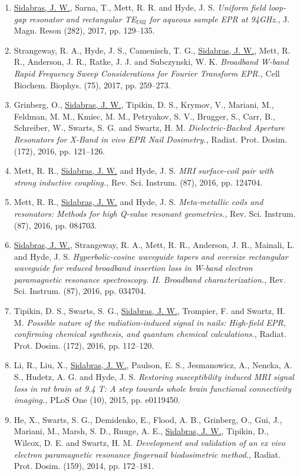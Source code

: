 \begin{enumerate}
    \item \underline{Sidabras, J. W.}, Sarna, T., Mett, R. R. and Hyde, J. S. \textit{Uniform field loop-gap resonator and rectangular TE$_{U02}$ for aqueous sample EPR at 94GHz.,} J. Magn. Reson (282), 2017, pp. 129--135.
    \item Strangeway, R. A., Hyde, J. S., Camenisch, T. G., \underline{Sidabras, J. W.}, Mett, R. R., Anderson, J. R., Ratke, J. J. and Subczynski, W. K. \textit{Broadband W-band Rapid Frequency Sweep Considerations for Fourier Transform EPR.,} Cell Biochem. Biophys. (75), 2017, pp. 259--273.
    \item Grinberg, O., \underline{Sidabras, J. W.}, Tipikin, D. S., Krymov, V., Mariani, M., Feldman, M. M., Kmiec, M. M., Petryakov, S. V., Brugger, S., Carr, B., Schreiber, W., Swarts, S. G. and Swartz, H. M. \textit{Dielectric-Backed Aperture Resonators for X-Band in vivo EPR Nail Dosimetry.,} Radiat. Prot. Dosim. (172), 2016, pp. 121--126.
    \item Mett, R. R., \underline{Sidabras, J. W.} and Hyde, J. S. \textit{MRI surface-coil pair with strong inductive coupling.,} Rev. Sci. Instrum. (87), 2016, pp. 124704.
    \item Mett, R. R., \underline{Sidabras, J. W.} and Hyde, J. S. \textit{Meta-metallic coils and resonators: Methods for high Q-value resonant geometries.,} Rev. Sci. Instrum. (87), 2016, pp. 084703.
    \item \underline{Sidabras, J. W.}, Strangeway, R. A., Mett, R. R., Anderson, J. R., Mainali, L. and Hyde, J. S. \textit{Hyperbolic-cosine waveguide tapers and oversize rectangular waveguide for reduced broadband insertion loss in W-band electron paramagnetic resonance spectroscopy. II. Broadband characterization.,} Rev. Sci. Instrum. (87), 2016, pp. 034704.
    \item Tipikin, D. S., Swarts, S. G., \underline{Sidabras, J. W.}, Trompier, F. and Swartz, H. M. \textit{Possible nature of the radiation-induced signal in nails: High-field EPR, confirming chemical synthesis, and quantum chemical calculations.,} Radiat. Prot. Dosim. (172), 2016, pp. 112--120.
    \item Li, R., Liu, X., \underline{Sidabras, J. W.}, Paulson, E. S., Jesmanowicz, A., Nencka, A. S., Hudetz, A. G. and Hyde, J. S. \textit{Restoring susceptibility induced MRI signal loss in rat brain at 9.4 T: A step towards whole brain functional connectivity imaging.,} PLoS One (10), 2015, pp. e0119450.
    \item He, X., Swarts, S. G., Demidenko, E., Flood, A. B., Grinberg, O., Gui, J., Mariani, M., Marsh, S. D., Ruuge, A. E., \underline{Sidabras, J. W.}, Tipikin, D., Wilcox, D. E. and Swartz, H. M. \textit{Development and validation of an ex vivo electron paramagnetic resonance fingernail biodosimetric method.,} Radiat. Prot. Dosim. (159), 2014, pp. 172--181.

\end{enumerate}
